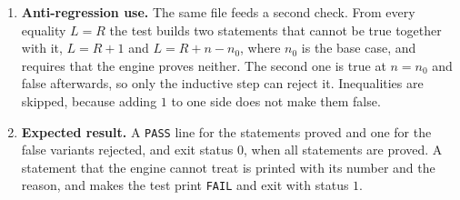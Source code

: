 \documentclass[11pt,a4paper]{article}
\begin{document}
\begin{enumerate}
\item \textbf{Anti-regression use.} The same file feeds a second check. From every equality $L = R$ the test builds two statements that cannot be true together with it, $L = R + 1$ and $L = R + n - n_{0}$, where $n_{0}$ is the base case, and requires that the engine proves neither. The second one is true at $n = n_{0}$ and false afterwards, so only the inductive step can reject it. Inequalities are skipped, because adding $1$ to one side does not make them false.

\item \textbf{Expected result.} A \texttt{PASS} line for the statements proved and one for the false variants rejected, and exit status $0$, when all statements are proved. A statement that the engine cannot treat is printed with its number and the reason, and makes the test print \texttt{FAIL} and exit with status $1$.
\end{enumerate}
\end{document}
